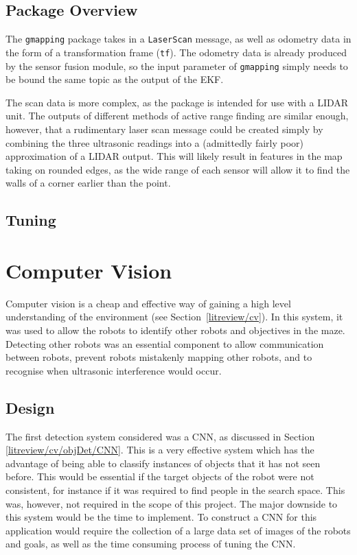 \subsection{Package Overview}\label{soft/SLAM/package}

The \verb|gmapping| package takes in a \verb|LaserScan| message, as well as odometry data in the form of a transformation frame (\verb|tf|). The odometry data is already produced by the sensor fusion module, so the input parameter of \verb|gmapping| simply needs to be bound the same topic as the output of the EKF.

The scan data is more complex, as the package is intended for use with a LIDAR unit. The outputs of different methods of active range finding are similar enough, however, that a rudimentary laser scan message could be created simply by combining the three ultrasonic readings into a (admittedly fairly poor) approximation of a LIDAR output. This will likely result in features in the map taking on rounded edges, as the wide range of each sensor will allow it to find the walls of a corner earlier than the point.



\subsection{Tuning}\label{soft/SLAM/tuning}

\section{Computer Vision}\label{soft/cv}
Computer vision is a cheap and effective way of gaining a high level
understanding of the environment (see Section~\ref{litreview/cv}). In this system, it was used to allow the robots to
identify other robots and objectives in the maze. Detecting other
robots was an essential component to allow communication between robots,
prevent robots mistakenly mapping other robots, and to recognise when
ultrasonic interference would occur.

\subsection{Design}\label{soft/cv/design}
The first detection system considered was a CNN, as discussed in Section
\ref{litreview/cv/objDet/CNN}. This is a very effective system which has
the advantage of
being able to classify instances of objects that it has not
seen before. This would be essential if the target objects of
the robot were not consistent, for instance if it was required to find
people in the search space. This was, however, not required
in the scope of this project. The major downside to this
system would be the time to implement. To construct a CNN for
this application would require the collection of a large data
set of images of the robots and goals, as well as the time
consuming process of tuning the CNN.

